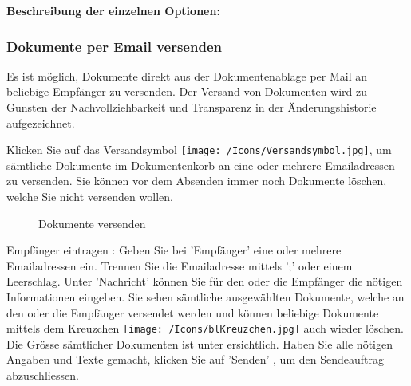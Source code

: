 \vspace{\baselineskip}

\textbf{Beschreibung der einzelnen Optionen:}

\subsubsection{Dokumente per Email versenden}
\label{bkm:Ref201701127}

Es ist möglich, Dokumente direkt aus der Dokumentenablage per Mail an beliebige Empfänger zu versenden. Der Versand von Dokumenten wird zu Gunsten der Nachvollziehbarkeit und Transparenz in der Änderungshistorie aufgezeichnet.

Klicken Sie auf das Versandsymbol \texttt{[image: /Icons/Versandsymbol.jpg]}, um sämtliche Dokumente im Dokumentenkorb an eine oder mehrere Emailadressen zu versenden. Sie können vor dem Absenden immer noch Dokumente löschen, welche Sie nicht versenden wollen.

\begin{figure}[H]
\caption{Dokumente versenden}
\end{figure}

Empfänger eintragen : Geben Sie bei 'Empfänger' eine oder mehrere Emailadressen ein. Trennen Sie die Emailadresse mittels ';' oder einem Leerschlag.
Unter 'Nachricht'  können Sie für den oder die Empfänger die nötigen Informationen eingeben. Sie sehen sämtliche ausgewählten Dokumente, welche an den oder die Empfänger versendet werden und können beliebige Dokumente mittels dem Kreuzchen \texttt{[image: /Icons/blKreuzchen.jpg]}  auch wieder löschen. Die Grösse sämtlicher Dokumenten ist unter  ersichtlich. Haben Sie alle nötigen Angaben und Texte gemacht, klicken Sie auf 'Senden' , um den Sendeauftrag abzuschliessen.

\vspace{\baselineskip}

